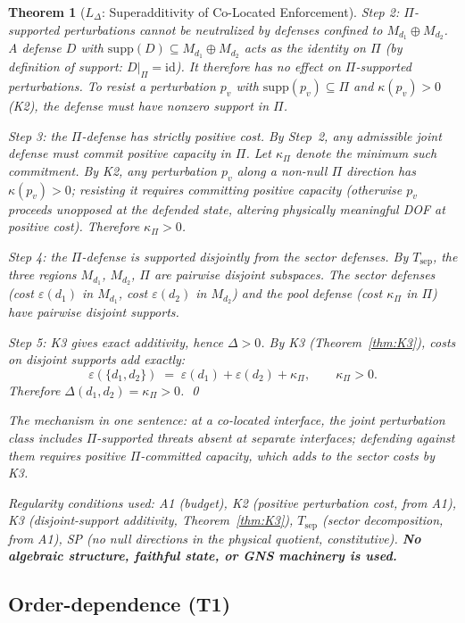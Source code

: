 \documentclass[11pt,a4paper]{article}
\newtheorem{theorem}{Theorem}[section]
\theoremstyle{definition}
\newcommand{\eps}{\varepsilon}
\begin{document}
\begin{theorem}[$L_\Delta$: Superadditivity of Co-Located Enforcement]
\textit{Step 2: $\Pi$-supported perturbations cannot be neutralized by defenses confined to $M_{d_1} \oplus M_{d_2}$.}
A defense $D$ with $\mathrm{supp}(D) \subseteq M_{d_1} \oplus M_{d_2}$ acts as the identity on $\Pi$ (by definition of support: $D|_{\Pi} = \mathrm{id}$).  It therefore has no effect on $\Pi$-supported perturbations.  To resist a perturbation $p_v$ with $\mathrm{supp}(p_v) \subseteq \Pi$ and $\kappa(p_v) > 0$ (K2), the defense must have nonzero support in $\Pi$.

\textit{Step 3: the $\Pi$-defense has strictly positive cost.}
By Step~2, any admissible joint defense must commit positive capacity in $\Pi$.  Let $\kappa_\Pi$ denote the minimum such commitment.  By K2, any perturbation $p_v$ along a non-null $\Pi$ direction has $\kappa(p_v) > 0$; resisting it requires committing positive capacity (otherwise $p_v$ proceeds unopposed at the defended state, altering physically meaningful DOF at positive cost).  Therefore $\kappa_\Pi > 0$.

\textit{Step 4: the $\Pi$-defense is supported disjointly from the sector defenses.}
By $T_{\mathrm{sep}}$, the three regions $M_{d_1}$, $M_{d_2}$, $\Pi$ are pairwise disjoint subspaces.  The sector defenses (cost $\eps(d_1)$ in $M_{d_1}$, cost $\eps(d_2)$ in $M_{d_2}$) and the pool defense (cost $\kappa_\Pi$ in $\Pi$) have pairwise disjoint supports.

\textit{Step 5: K3 gives exact additivity, hence $\Delta > 0$.}
By K3 (Theorem~\ref{thm:K3}), costs on disjoint supports add exactly:
\[
\eps(\{d_1, d_2\}) \;=\; \eps(d_1) + \eps(d_2) + \kappa_\Pi, \qquad \kappa_\Pi > 0.
\]
Therefore $\Delta(d_1, d_2) = \kappa_\Pi > 0$.  \qed

\noindent\textit{The mechanism in one sentence:} at a co-located interface, the joint perturbation class includes $\Pi$-supported threats absent at separate interfaces; defending against them requires positive $\Pi$-committed capacity, which adds to the sector costs by K3.

\noindent\textit{Regularity conditions used:} A1 (budget), K2 (positive perturbation cost, from A1), K3 (disjoint-support additivity, Theorem~\ref{thm:K3}), $T_{\mathrm{sep}}$ (sector decomposition, from A1), SP (no null directions in the physical quotient, constitutive).  \textbf{No algebraic structure, faithful state, or GNS machinery is used.}
\end{theorem}

\subsection{Order-dependence (T1)}
\end{document}

